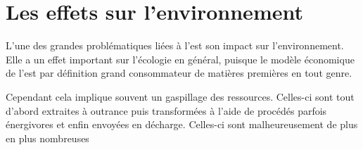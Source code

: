 \section{Les effets sur l’environnement }

\smallbreak L'une des grandes problématiques liées à l'\op est son impact sur l'environnement. Elle a un effet important sur l'écologie en général, puisque le modèle économique de l'\op est par définition grand consommateur de matières premières en tout genre. 

Cependant cela implique souvent un gaspillage des ressources. Celles-ci sont tout d'abord extraites à outrance puis transformées à l'aide de procédés parfois énergivores et enfin envoyées en décharge. Celles-ci sont malheureusement de plus en plus nombreuses
